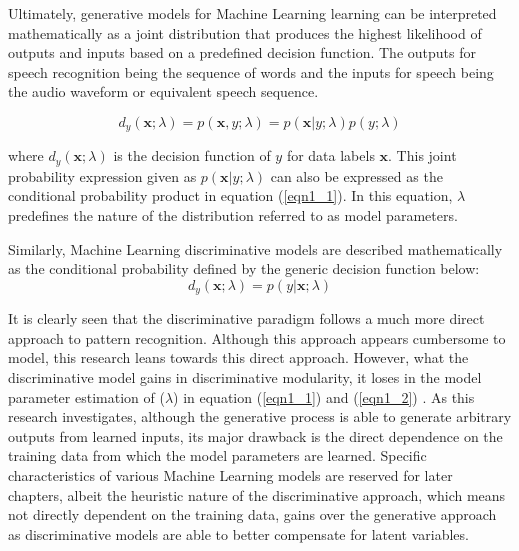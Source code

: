 Ultimately, generative models for Machine Learning learning can be interpreted mathematically as a joint distribution that produces the highest likelihood of outputs and inputs based on a predefined decision function.  The outputs for speech recognition being the sequence of words and the inputs for speech being the audio waveform or equivalent speech sequence.

\begin{equation}
d_y(\mathbf{x};\lambda)=p(\mathbf{x},y;\lambda)=p(\mathbf{x}|y;\lambda)p(y;\lambda)
\label{eqn1_1}
\end{equation}

where $d_y(\mathbf{x};\lambda)$ is the decision function of $y$ for data labels $\mathbf{x}$.  This joint probability expression given as $p(\mathbf{x}|y;\lambda)$ can also be expressed as the conditional probability product in equation (\ref{eqn1_1}).  In this equation, $\lambda$ predefines the nature of the distribution \citep{deng2013machine} referred to as model parameters.

Similarly, Machine Learning discriminative models are described mathematically as the conditional probability defined by the generic decision function below:
\begin{equation}
d_y(\mathbf{x};\lambda)=p(y|\mathbf{x};\lambda)
\label{eqn1_2}
\end{equation}

It is clearly seen that the discriminative paradigm follows a much more direct approach to pattern recognition. Although this approach appears cumbersome to model, this research leans towards this direct approach.  However, what the discriminative model gains in discriminative modularity, it loses in the model parameter estimation of ($\lambda$) in equation  (\ref{eqn1_1}) and (\ref{eqn1_2}) \citep{gales2012structured}.  
 As this research investigates, although the generative process is able to generate arbitrary outputs from learned inputs, its major drawback is the direct dependence on the training data from which the model parameters are learned. Specific characteristics of various Machine Learning models are reserved for later chapters, albeit the heuristic nature of the discriminative approach, which means not directly dependent on the training data,  gains over the generative approach as discriminative models are able to better compensate for latent variables.  
 
